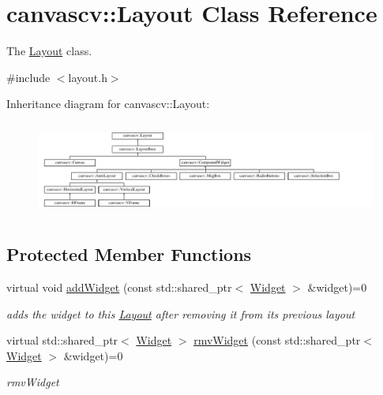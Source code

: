 \hypertarget{classcanvascv_1_1Layout}{}\section{canvascv\+:\+:Layout Class Reference}
\label{classcanvascv_1_1Layout}


The \hyperlink{classcanvascv_1_1Layout}{Layout} class.  




{\ttfamily \#include $<$layout.\+h$>$}

Inheritance diagram for canvascv\+:\+:Layout\+:\begin{figure}[H]
\begin{center}
\leavevmode
\includegraphics[height=3.128491cm]{classcanvascv_1_1Layout}
\end{center}
\end{figure}
\subsection*{Protected Member Functions}
\begin{DoxyCompactItemize}
\item 
virtual void \hyperlink{classcanvascv_1_1Layout_a90b4264dce5634f09d555c22358e35f0}{add\+Widget} (const std\+::shared\+\_\+ptr$<$ \hyperlink{classcanvascv_1_1Widget}{Widget} $>$ \&widget)=0\hypertarget{classcanvascv_1_1Layout_a90b4264dce5634f09d555c22358e35f0}{}\label{classcanvascv_1_1Layout_a90b4264dce5634f09d555c22358e35f0}

\begin{DoxyCompactList}\small\item\em adds the widget to this \hyperlink{classcanvascv_1_1Layout}{Layout} after removing it from it\textquotesingle{}s previous layout \end{DoxyCompactList}\item 
virtual std\+::shared\+\_\+ptr$<$ \hyperlink{classcanvascv_1_1Widget}{Widget} $>$ \hyperlink{classcanvascv_1_1Layout_a7b532816232c436ea5b6e7c4c3254779}{rmv\+Widget} (const std\+::shared\+\_\+ptr$<$ \hyperlink{classcanvascv_1_1Widget}{Widget} $>$ \&widget)=0
\begin{DoxyCompactList}\small\item\em rmv\+Widget \end{DoxyCompactList}\end{DoxyCompactItemize}


